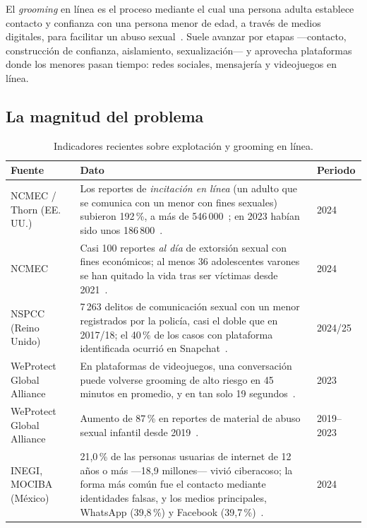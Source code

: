 \documentclass[11pt,a4paper]{article}
\begin{document}
El \emph{grooming} en línea es el proceso mediante el cual una persona adulta establece contacto y confianza con una persona menor de edad, a través de medios digitales, para facilitar un abuso sexual~\cite{whittle2013}. Suele avanzar por etapas ---contacto, construcción de confianza, aislamiento, sexualización--- y aprovecha plataformas donde los menores pasan tiempo: redes sociales, mensajería y videojuegos en línea.

\subsection{La magnitud del problema}

\begin{table}[H]
\centering
\caption{Indicadores recientes sobre explotación y grooming en línea.}
\label{tab:estadisticas}
\small
\begin{tabularx}{\linewidth}{@{}>{\raggedright\arraybackslash}p{3.0cm}Lp{1.7cm}@{}}
\toprule
\textbf{Fuente} & \textbf{Dato} & \textbf{Periodo} \\
\midrule
NCMEC / Thorn (EE.\,UU.) & Los reportes de \emph{incitación en línea} (un adulto que se comunica con un menor con fines sexuales) subieron 192\,\%, a más de 546\,000~\cite{thorn2025}; en 2023 habían sido unos 186\,800~\cite{ncmec2025}. & 2024 \\
NCMEC & Casi 100 reportes \emph{al día} de extorsión sexual con fines económicos; al menos 36 adolescentes varones se han quitado la vida tras ser víctimas desde 2021~\cite{ncmec2025}. & 2024 \\
NSPCC (Reino Unido) & 7\,263 delitos de comunicación sexual con un menor registrados por la policía, casi el doble que en 2017/18; el 40\,\% de los casos con plataforma identificada ocurrió en Snapchat~\cite{nspcc2025}. & 2024/25 \\
WeProtect Global Alliance & En plataformas de videojuegos, una conversación puede volverse grooming de alto riesgo en 45 minutos en promedio, y en tan solo 19 segundos~\cite{weprotect2023}. & 2023 \\
WeProtect Global Alliance & Aumento de 87\,\% en reportes de material de abuso sexual infantil desde 2019~\cite{weprotect2023}. & 2019--2023 \\
INEGI, MOCIBA (México) & 21,0\,\% de las personas usuarias de internet de 12 años o más ---18,9 millones--- vivió ciberacoso; la forma más común fue el contacto mediante identidades falsas, y los medios principales, WhatsApp (39,8\,\%) y Facebook (39,7\,\%)~\cite{inegi2025}. & 2024 \\
\bottomrule
\end{tabularx}
\end{table}
\end{document}
